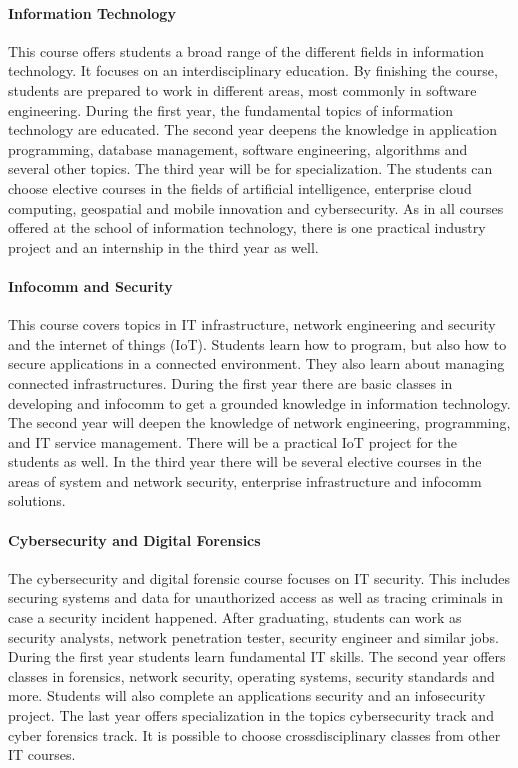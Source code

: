 \paragraph{Information Technology}
This course offers students a broad range of the different fields in information technology. It focuses on an interdisciplinary education. By finishing the course, students are prepared to work in different areas, most commonly in software engineering. During the first year, the fundamental topics of information technology are educated. The second year deepens the knowledge in application programming, database management, software engineering, algorithms and several other topics. The third year will be for specialization. The students can choose elective courses in the fields of artificial intelligence, enterprise cloud computing, geospatial and mobile innovation and cybersecurity. As in all courses offered at the school of information technology, there is one practical industry project and an internship in the third year as well.

\paragraph{Infocomm and Security}
This course covers topics in IT infrastructure, network engineering and security and the internet of things (IoT). Students learn how to program, but also how to secure applications in a connected environment. They also learn about managing connected infrastructures. During the first year there are basic classes in developing and infocomm to get a grounded knowledge in information technology. The second year will deepen the knowledge of network engineering, programming, and IT service management. There will be a practical IoT project for the students as well.
In the third year there will be several elective courses in the areas of system and network security, enterprise infrastructure and infocomm solutions.

\paragraph{Cybersecurity and Digital Forensics}
The cybersecurity and digital forensic course focuses on IT security. This includes securing systems and data for unauthorized access as well as tracing criminals in case a security incident happened. After graduating, students can work as security analysts, network penetration tester, security engineer and similar jobs. During the first year students learn fundamental IT skills. The second year offers classes in forensics, network security, operating systems, security standards and more. Students will also complete an applications security and an infosecurity project.
The last year offers specialization in the topics cybersecurity track and cyber forensics track. It is possible to choose crossdisciplinary classes from other IT courses.

